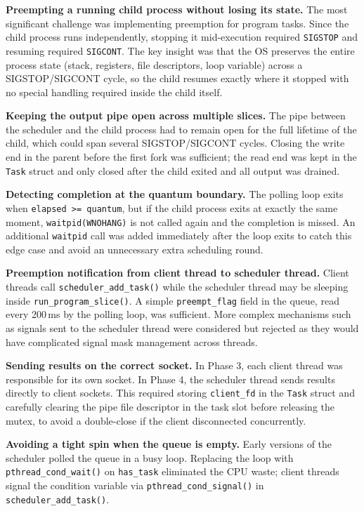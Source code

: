 \documentclass[12pt]{article}
\begin{document}
\textbf{Preempting a running child process without losing its state.}
The most significant challenge was implementing preemption for program tasks. Since the
child process runs independently, stopping it mid-execution required \texttt{SIGSTOP} and
resuming required \texttt{SIGCONT}. The key insight was that the OS preserves the entire
process state (stack, registers, file descriptors, loop variable) across a
SIGSTOP/SIGCONT cycle, so the child resumes exactly where it stopped with no special
handling required inside the child itself.

\textbf{Keeping the output pipe open across multiple slices.}
The pipe between the scheduler and the child process had to remain open for the full
lifetime of the child, which could span several SIGSTOP/SIGCONT cycles. Closing the
write end in the parent before the first fork was sufficient; the read end was kept in the
\texttt{Task} struct and only closed after the child exited and all output was drained.

\textbf{Detecting completion at the quantum boundary.}
The polling loop exits when \texttt{elapsed >= quantum}, but if the child process exits
at exactly the same moment, \texttt{waitpid(WNOHANG)} is not called again and the
completion is missed. An additional \texttt{waitpid} call was added immediately after the
loop exits to catch this edge case and avoid an unnecessary extra scheduling round.

\textbf{Preemption notification from client thread to scheduler thread.}
Client threads call \texttt{scheduler\_add\_task()} while the scheduler thread may be
sleeping inside \texttt{run\_program\_slice()}. A simple \texttt{preempt\_flag} field in
the queue, read every 200\,ms by the polling loop, was sufficient. More complex mechanisms
such as signals sent to the scheduler thread were considered but rejected as they would
have complicated signal mask management across threads.

\textbf{Sending results on the correct socket.}
In Phase 3, each client thread was responsible for its own socket. In Phase 4, the
scheduler thread sends results directly to client sockets. This required storing
\texttt{client\_fd} in the \texttt{Task} struct and carefully clearing the pipe file
descriptor in the task slot before releasing the mutex, to avoid a double-close if the
client disconnected concurrently.

\textbf{Avoiding a tight spin when the queue is empty.}
Early versions of the scheduler polled the queue in a busy loop. Replacing the loop with
\texttt{pthread\_cond\_wait()} on \texttt{has\_task} eliminated the CPU waste; client
threads signal the condition variable via \texttt{pthread\_cond\_signal()} in
\texttt{scheduler\_add\_task()}.
\end{document}
